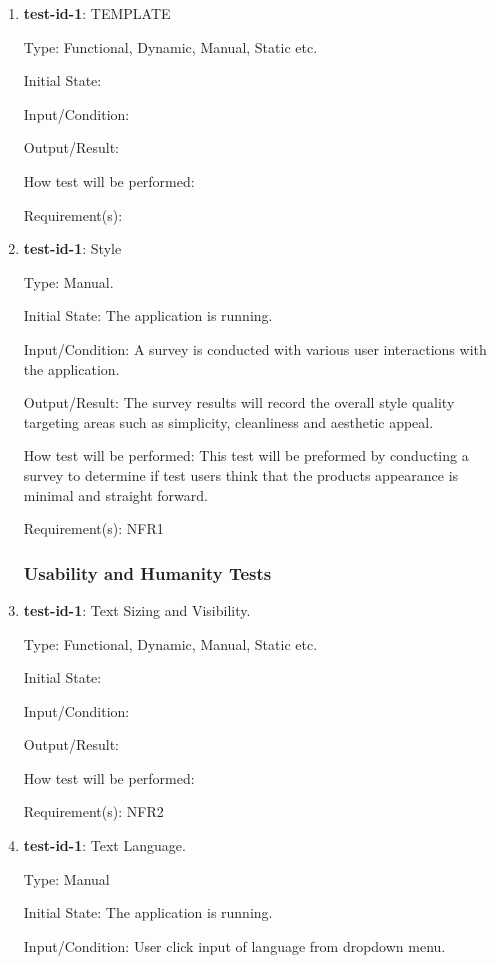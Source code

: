 \documentclass[12pt, titlepage]{article}
\begin{document}
	
	\begin{enumerate}
		
		\item{\textbf{test-id-1}}: TEMPLATE
		
		Type: Functional, Dynamic, Manual, Static etc.
		
		Initial State: 
		
		Input/Condition: 
		
		Output/Result: 
		
		How test will be performed: 
		
		Requirement(s):
			
		\item{\textbf{test-id-1}}: Style

		Type: Manual.
		
		Initial State: The application is running.
		
		Input/Condition: A survey is conducted with various user interactions with the application. 
		
		Output/Result: The survey results will record the overall style quality targeting areas such as simplicity, cleanliness and aesthetic appeal. 
		
		How test will be performed: This test will be preformed by conducting a survey to determine if test users think that the products appearance is minimal and straight forward.
		
		Requirement(s): NFR1
		
		

	
	\subsubsection{Usability and Humanity Tests}
		\item{\textbf{test-id-1}}: Text Sizing and Visibility.
		
		Type: Functional, Dynamic, Manual, Static etc.
		
		Initial State: 
		
		Input/Condition: 
		
		Output/Result: 
		
		How test will be performed: 
		
		Requirement(s): NFR2
		
		\item{\textbf{test-id-1}}: Text Language.
		
		Type: Manual
		
		Initial State: The application is running.
		
		Input/Condition: User click input of language from dropdown menu.


\end{enumerate}
\end{document}
